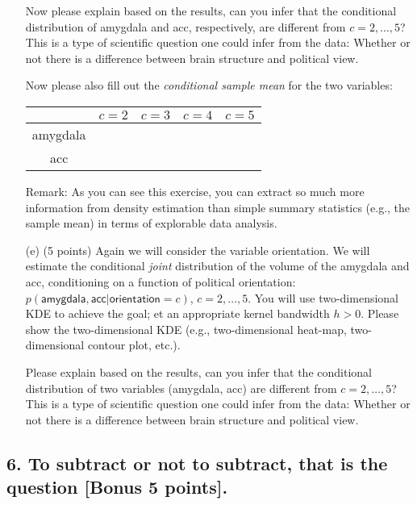 \documentclass[twoside,10pt]{article}
\begin{document}
\begin{enumerate}
 
Now please explain based on the results, can you infer that the conditional distribution of  \textsf{amygdala} and \textsf{acc}, respectively, are different from $c = 2, \ldots, 5$? This is a type of scientific question one could infer from the data: Whether or not there is a difference between brain structure and political view. 

Now please also fill out the {\it conditional sample mean} for the two variables: %
\begin{center}
\begin{tabular}{|c|c|c|c|c|}
\hline
& $c = 2$ & $c = 3$ & $c = 4$ & $c = 5$ \\\hline
\textsf{amygdala} & & & & \\\hline
\textsf{acc} & & & & \\\hline
\end{tabular}
\end{center}
Remark: As you can see this exercise, you can extract so much more information from density estimation than simple summary statistics (e.g., the sample mean) in terms of explorable data analysis.  
 
 \item[(e)] (5 points) Again we will consider the variable \textsf{orientation}. We will estimate the conditional {\it joint} distribution of the volume of the \textsf{amygdala} and \textsf{acc}, conditioning on  a function of political \textsf{orientation}: $p(\textsf{amygdala}, \textsf{acc}|\textsf{orientation}=c)$, $c = 2, \ldots, 5$. You will use two-dimensional KDE to achieve the goal; et an appropriate kernel bandwidth $h >0$. Please show the two-dimensional KDE (e.g., two-dimensional heat-map, two-dimensional contour plot, etc.). 
 
 Please explain based on the results, can you infer that the conditional distribution of two variables (\textsf{amygdala}, \textsf{acc}) are different from $c = 2, \ldots, 5$? This is a type of scientific question one could infer from the data: Whether or not there is a difference between brain structure and political view.
 
  
 \end{enumerate}


\clearpage

\subsection*{6. To subtract or not to subtract, that is the question [Bonus 5 points].}
\end{document}

